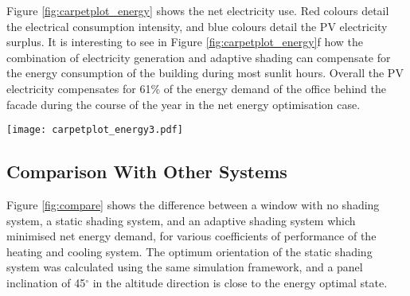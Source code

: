 
Figure \ref{fig:carpetplot_energy} shows the net electricity use. Red colours detail the electrical consumption intensity, and blue colours detail the PV electricity surplus. It is interesting to see in Figure \ref{fig:carpetplot_energy}f how the combination of electricity generation and adaptive shading can compensate for the energy consumption of the building during most sunlit hours. Overall the PV electricity compensates for 61\% of the energy demand of the office behind the facade during the course of the year in the net energy optimisation case.

\begin{figure*}
\begin{center}
\texttt{[image: carpetplot\_energy3.pdf]}
\caption{Carpet plots detailing the net energy consumption. Each square represents the total energy consumption for that specific hour of the entire month. Red colours detail net energy consumption, while blue colours detail net energy production.}
\label{fig:carpetplot_energy}
\end{center}
\end{figure*}


\subsection{Comparison With Other Systems}
\label{ch:comparison}


Figure \ref{fig:compare} shows the difference between a window with no shading system, a static shading system, and an adaptive shading system which minimised net energy demand, for various coefficients of performance of the heating and cooling system. The optimum orientation of the static shading system was calculated using the same simulation framework, and a panel inclination of 45$^{\circ}$ in the altitude direction is close to the energy optimal state.

